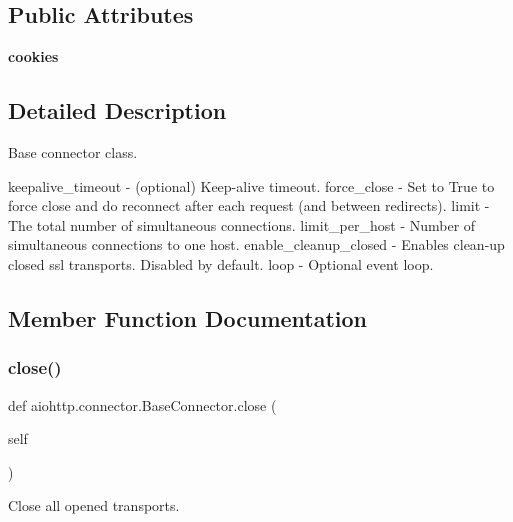 \subsection*{Public Attributes}
\begin{DoxyCompactItemize}
\item 
\mbox{\label{classaiohttp_1_1connector_1_1_base_connector_aa9224b1e47b7f26f6ab64912d7927fe1}} 
{\bfseries cookies}
\end{DoxyCompactItemize}


\subsection{Detailed Description}
\begin{DoxyVerb}Base connector class.

keepalive_timeout - (optional) Keep-alive timeout.
force_close - Set to True to force close and do reconnect
    after each request (and between redirects).
limit - The total number of simultaneous connections.
limit_per_host - Number of simultaneous connections to one host.
enable_cleanup_closed - Enables clean-up closed ssl transports.
                        Disabled by default.
loop - Optional event loop.
\end{DoxyVerb}
 

\subsection{Member Function Documentation}
\mbox{\label{classaiohttp_1_1connector_1_1_base_connector_abee47311f998049bf175922c24941be0}} 
\subsubsection{\texorpdfstring{close()}{close()}}
{\footnotesize\ttfamily def aiohttp.\+connector.\+Base\+Connector.\+close (\begin{DoxyParamCaption}\item[{}]{self }\end{DoxyParamCaption})}

\begin{DoxyVerb}Close all opened transports.\end{DoxyVerb}
 \mbox{\label{classaiohttp_1_1connector_1_1_base_connector_a25be9f73d8222bad85a80d99589ec531}} 
